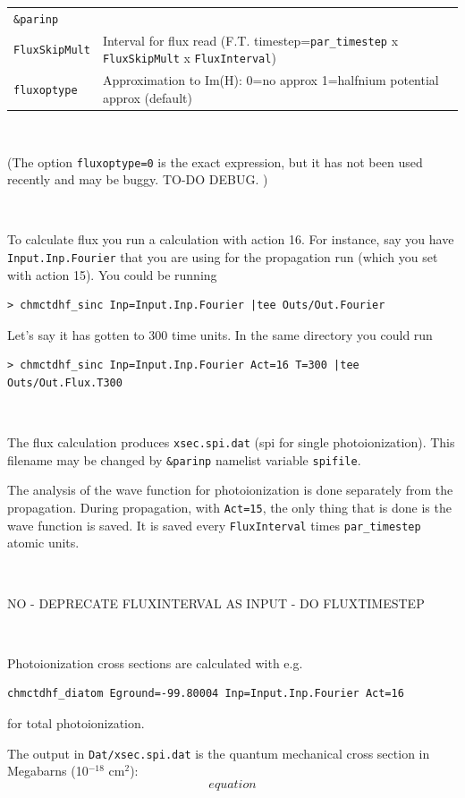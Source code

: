 \documentclass[10pt,leqno, oneside]{book}
\begin{document}
{\footnotesize
\begin{tabular}{ll}
\verb#&parinp# \\
\verb#FluxSkipMult#  & Interval for flux read (F.T. timestep=\verb#par_timestep# x \verb#FluxSkipMult# x \verb#FluxInterval#) \\
\verb#fluxoptype#  & Approximation to Im(H): 0=no approx 1=halfnium potential approx (default) \\
\end{tabular}}

\

(The option \verb#fluxoptype=0# is the exact expression, but it has not been used recently and may be buggy.  TO-DO DEBUG. )

\

To calculate flux you run a calculation with action 16.  For instance, say you have \verb#Input.Inp.Fourier# that you are using for the propagation run
(which you set with action 15).  You could be running
\begin{verbatim}
> chmctdhf_sinc Inp=Input.Inp.Fourier |tee Outs/Out.Fourier
\end{verbatim}
Let's say it has gotten to 300 time units.  In the same directory you could run
\begin{verbatim}
> chmctdhf_sinc Inp=Input.Inp.Fourier Act=16 T=300 |tee Outs/Out.Flux.T300
\end{verbatim}

\

The flux calculation produces \verb#xsec.spi.dat# (spi for single photoionization).  This filename may be changed by \verb#&parinp# namelist
variable \verb#spifile#.

The analysis of the wave function for photoionization is done separately from the propagation.  During propagation, with \verb#Act=15#,
the only thing that is done is the wave function is saved.  It is saved every \verb#FluxInterval# times \verb#par_timestep# atomic units.

\

NO - DEPRECATE FLUXINTERVAL AS INPUT - DO FLUXTIMESTEP

\



Photoionization cross sections are calculated with e.g. 
\begin{verbatim}
chmctdhf_diatom Eground=-99.80004 Inp=Input.Inp.Fourier Act=16
\end{verbatim}
for total photoionization.

The output in \verb#Dat/xsec.spi.dat# is the quantum mechanical cross section in Megabarns (10$^{-18}$ cm$^{2}$):
\begin{equation}
equation
\end{equation}
\end{document}
